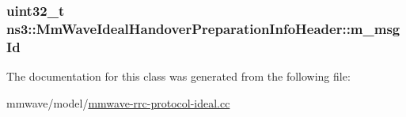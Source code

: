 \subsubsection[{\texorpdfstring{m\+\_\+msg\+Id}{m_msgId}}]{\setlength{\rightskip}{0pt plus 5cm}uint32\+\_\+t ns3\+::\+Mm\+Wave\+Ideal\+Handover\+Preparation\+Info\+Header\+::m\+\_\+msg\+Id\hspace{0.3cm}{\ttfamily [private]}}\hypertarget{classns3_1_1MmWaveIdealHandoverPreparationInfoHeader_aa37ea28102a6dd94f352fe04961f3f59}{}\label{classns3_1_1MmWaveIdealHandoverPreparationInfoHeader_aa37ea28102a6dd94f352fe04961f3f59}


The documentation for this class was generated from the following file\+:\begin{DoxyCompactItemize}
\item 
mmwave/model/\hyperlink{mmwave-rrc-protocol-ideal_8cc}{mmwave-\/rrc-\/protocol-\/ideal.\+cc}\end{DoxyCompactItemize}
